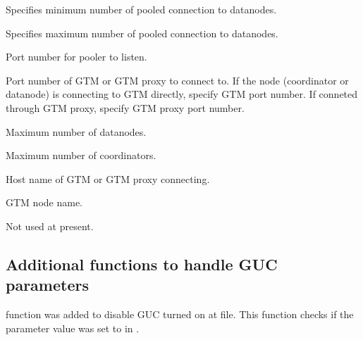   
    Specifies minimum number of pooled connection to datanodes.
  
  
    Specifies maximum number of pooled connection to datanodes.
  
  
    Port number for pooler to listen.
  
  
    Port number of GTM or GTM proxy to connect to.
    If the node (coordinator or datanode) is connecting to GTM directly, specify GTM port number.
    If conneted through GTM proxy, specify GTM proxy port number.
  
  
    Maximum number of datanodes.
  
  
    Maximum number of coordinators.
  
  
    Host name of GTM or GTM proxy connecting.
  
  
    GTM node name.
  
  
    Not used at present.



\subsection{Additional functions to handle GUC parameters}

   function was added to disable 
  GUC turned on at  file.
  This function checks if the parameter value was set to  in .

